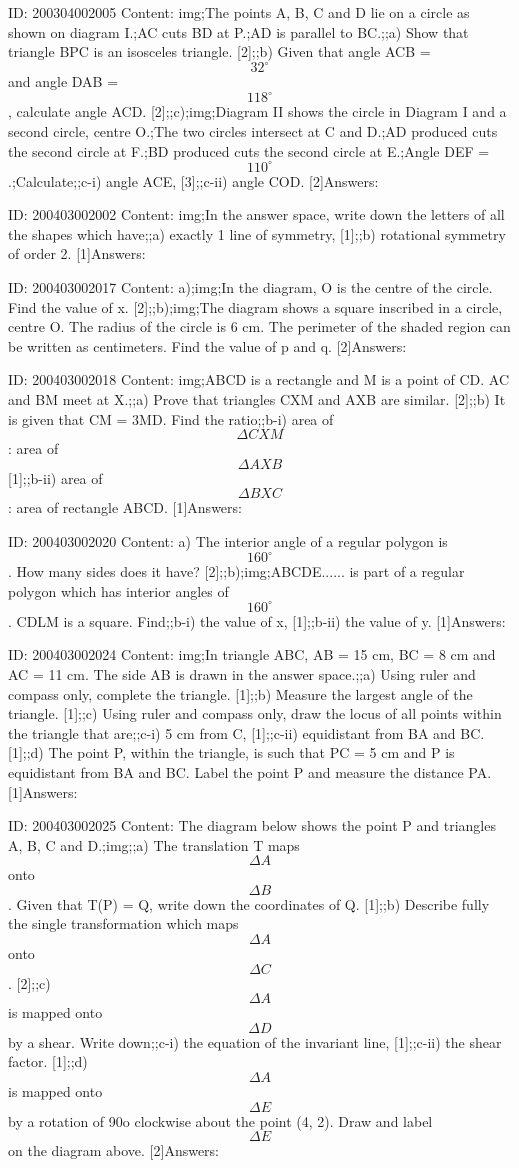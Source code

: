 \documentclass{article}
\begin{document}
ID: 200304002005
Content:
img;The points A, B, C and D lie on a circle as shown on diagram I.;AC cuts BD at P.;AD is parallel to BC.;;a) Show that triangle BPC is an isosceles triangle.   [2];;b) Given that angle ACB = $$32^{\circ}$$ and angle DAB = $$118^{\circ}$$, calculate angle ACD.   [2];;c);img;Diagram II shows the circle in Diagram I and a second circle, centre O.;The two circles intersect at C and D.;AD produced cuts the second circle at F.;BD produced cuts the second circle at E.;Angle DEF = $$110^{\circ}$$.;Calculate;;c-i) angle ACE,   [3];;c-ii) angle COD.   [2]Answers:

ID: 200403002002
Content:
img;In the answer space, write down the letters of all the shapes which have;;a) exactly 1 line of symmetry, [1];;b) rotational symmetry of order 2. [1]Answers:

ID: 200403002017
Content:
a);img;In the diagram, O is the centre of the circle. Find the value of x. [2];;b);img;The diagram shows a square inscribed in a circle, centre O. The radius of the circle is 6 cm. The perimeter of the shaded region can be written as centimeters. Find the value of p and q. [2]Answers:

ID: 200403002018
Content:
img;ABCD is a rectangle and M is a point of CD. AC and BM meet at X.;;a) Prove that triangles CXM and AXB are similar. [2];;b) It is given that CM = 3MD. Find the ratio;;b-i) area of $$\Delta  CXM$$: area of $$\Delta  AXB$$ [1];;b-ii) area of $$\Delta  BXC$$: area of rectangle ABCD. [1]Answers:

ID: 200403002020
Content:
a) The interior angle of a regular polygon is $$160^{\circ}$$. How many sides does it have? [2];;b);img;ABCDE...... is part of a regular polygon which has interior angles of $$160^{\circ}$$. CDLM is a square. Find;;b-i) the value of x, [1];;b-ii) the value of y. [1]Answers:

ID: 200403002024
Content:
img;In triangle ABC, AB = 15 cm, BC = 8 cm and AC = 11 cm. The side AB is drawn in the answer space.;;a) Using ruler and compass only, complete the triangle. [1];;b) Measure the largest angle of the triangle. [1];;c) Using ruler and compass only, draw the locus of all points within the triangle that are;;c-i) 5 cm from C, [1];;c-ii) equidistant from BA and BC. [1];;d) The point P, within the triangle, is such that PC = 5 cm and P is equidistant from BA and BC. Label the point P and measure the distance PA. [1]Answers:

ID: 200403002025
Content:
The diagram below shows the point P and triangles A, B, C and D.;img;;a) The translation T maps $$\Delta  A$$ onto $$\Delta  B$$. Given that T(P) = Q, write down the coordinates of Q. [1];;b) Describe fully the single transformation which maps $$\Delta  A$$ onto $$\Delta  C$$. [2];;c) $$\Delta  A$$ is mapped onto $$\Delta  D$$ by a shear. Write down;;c-i) the equation of the invariant line, [1];;c-ii) the shear factor. [1];;d) $$\Delta  A$$ is mapped onto $$\Delta  E$$ by a rotation of 90o clockwise about the point (4, 2). Draw and label $$\Delta  E$$on the diagram above. [2]Answers:
\end{document}
